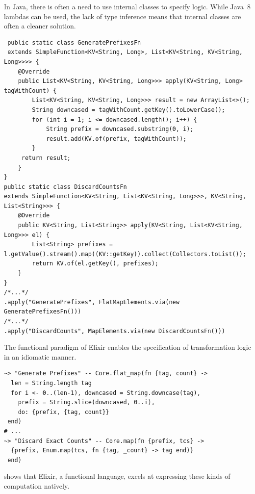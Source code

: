 \begin{codelisting}
	\caption[Using internal classes to specify transformation logic in Java.]{In Java, there is often a need to use internal classes to specify logic. While Java~8 lambdas can be used, the lack of type inference means that internal classes are often a cleaner solution.}
	\label{lst:eval:twitter-lambdas-java}
	\begin{verbatim}
 public static class GeneratePrefixesFn
 extends SimpleFunction<KV<String, Long>, List<KV<String, KV<String, Long>>>> {
    @Override
    public List<KV<String, KV<String, Long>>> apply(KV<String, Long> tagWithCount) {
        List<KV<String, KV<String, Long>>> result = new ArrayList<>();
        String downcased = tagWithCount.getKey().toLowerCase();
        for (int i = 1; i <= downcased.length(); i++) {
            String prefix = downcased.substring(0, i);
            result.add(KV.of(prefix, tagWithCount));
        }
     return result;
    }
}
public static class DiscardCountsFn
extends SimpleFunction<KV<String, List<KV<String, Long>>>, KV<String, List<String>>> {
    @Override
    public KV<String, List<String>> apply(KV<String, List<KV<String, Long>>> el) {
        List<String> prefixes = l.getValue().stream().map((KV::getKey)).collect(Collectors.toList());
        return KV.of(el.getKey(), prefixes);
    }
}
/*...*/
.apply("GeneratePrefixes", FlatMapElements.via(new GeneratePrefixesFn()))
/*...*/
.apply("DiscardCounts", MapElements.via(new DiscardCountsFn()))
	\end{verbatim}
\end{codelisting}

\begin{codelisting}
	\caption[Using lambdas to specify transformation logic in Elixir.]{The functional paradigm of Elixir enables the specification of transformation logic in an idiomatic manner.}
	\label{lst:eval:twitter-lambdas-elixir}
	\begin{verbatim}
~> "Generate Prefixes" -- Core.flat_map(fn {tag, count} ->
  len = String.length tag
  for i <- 0..(len-1), downcased = String.downcase(tag),
    prefix = String.slice(downcased, 0..i),
    do: {prefix, {tag, count}}
 end)
# ...
~> "Discard Exact Counts" -- Core.map(fn {prefix, tcs} ->
  {prefix, Enum.map(tcs, fn {tag, _count} -> tag end)}
 end)
	\end{verbatim}
\end{codelisting}

 shows that Elixir, a functional language, excels at expressing these kinds of computation natively.

